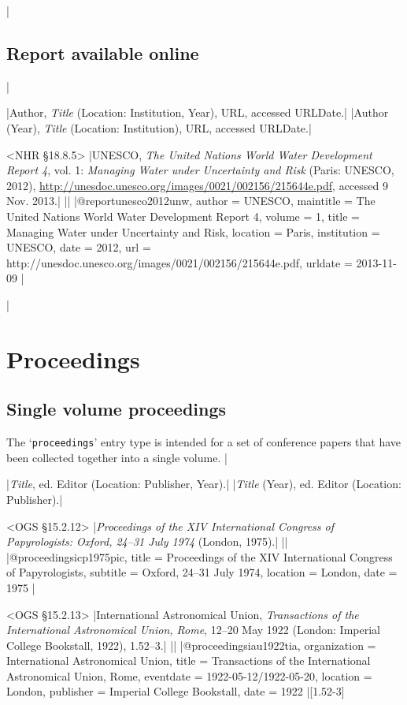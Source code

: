\documentclass[extrafontsizes,11pt,a4paper,oneside]{memoir}
\newcommand*{\lit}[1]{\textsf{#1}}
\newcommand*{\code}[1]{`\texttt{#1}'}
\begin{document}
\todoc|
\section{Report available online}
|

\specs
|Author, \emph{Title} (Location: Institution, Year), URL, \lit{accessed} URLDate.|%
|Author (Year), \emph{Title} (Location: Institution), URL, \lit{accessed} URLDate.|

\bibexample<NHR \S18.8.5>
|UNESCO, \emph{The United Nations World Water Development Report 4}, vol. 1: \emph{Managing Water under Uncertainty and Risk} (Paris: UNESCO, 2012), \url{http://unesdoc.unesco.org/images/0021/002156/215644e.pdf}, accessed 9 Nov. 2013.|%
||%
|@report{unesco2012unw,
  author = {UNESCO},
  maintitle = {The United Nations World Water Development Report 4},
  volume = {1},
  title = {Managing Water under Uncertainty and Risk},
  location = {Paris},
  institution = {UNESCO},
  date = {2012},
  url = {http://unesdoc.unesco.org/images/0021/002156/215644e.pdf},
  urldate = {2013-11-09}
}|

\todoc|
\chapter{Proceedings}\label{sec:proceedings}

\section{Single volume proceedings}

The \code{proceedings} entry type is intended for a set of conference papers that have been collected together into a single volume.
|

\specs
|\emph{Title}, \lit{ed.} Editor (Location: Publisher, Year).|%
|\emph{Title} (Year), \lit{ed.} Editor (Location: Publisher).|

\bibexample<OGS \S15.2.12>
|\emph{Proceedings of the XIV International Congress of Papyrologists: Oxford, 24--31 July 1974} (London, 1975).|%
||%
|@proceedings{icp1975pic,
  title = {Proceedings of the {XIV} {International} {Congress} of {Papyrologists}},
  subtitle = {{Oxford}, 24--31 {July} 1974},
  location = {London},
  date = {1975}
}|

\bibexample<OGS \S15.2.13>
|International Astronomical Union, \emph{Transactions of the International Astronomical Union, Rome}, 12--20 May 1922 (London: Imperial College Bookstall, 1922), 1.52–3.|%
||%
|@proceedings{iau1922tia,
  organization = {{International Astronomical Union}},
  title = {Transactions of the {International} {Astronomical} {Union}, {Rome}},
  eventdate = {1922-05-12/1922-05-20},
  location = {London},
  publisher = {Imperial College Bookstall},
  date = {1922}
}|[1.52-3]
\end{document}
